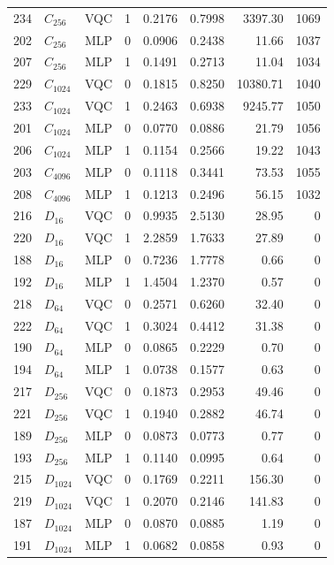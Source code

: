 \documentclass[11pt]{article}
\begin{document}
\begin{longtable}{rllrrrrr}
234 & $C_{256}$ & VQC & 1 & 0.2176 & 0.7998 & 3397.30 & 1069 \\
202 & $C_{256}$ & MLP & 0 & 0.0906 & 0.2438 & 11.66 & 1037 \\
207 & $C_{256}$ & MLP & 1 & 0.1491 & 0.2713 & 11.04 & 1034 \\
229 & $C_{1024}$ & VQC & 0 & 0.1815 & 0.8250 & 10380.71 & 1040 \\
233 & $C_{1024}$ & VQC & 1 & 0.2463 & 0.6938 & 9245.77 & 1050 \\
201 & $C_{1024}$ & MLP & 0 & 0.0770 & 0.0886 & 21.79 & 1056 \\
206 & $C_{1024}$ & MLP & 1 & 0.1154 & 0.2566 & 19.22 & 1043 \\
203 & $C_{4096}$ & MLP & 0 & 0.1118 & 0.3441 & 73.53 & 1055 \\
208 & $C_{4096}$ & MLP & 1 & 0.1213 & 0.2496 & 56.15 & 1032 \\
216 & $D_{16}$ & VQC & 0 & 0.9935 & 2.5130 & 28.95 & 0 \\
220 & $D_{16}$ & VQC & 1 & 2.2859 & 1.7633 & 27.89 & 0 \\
188 & $D_{16}$ & MLP & 0 & 0.7236 & 1.7778 & 0.66 & 0 \\
192 & $D_{16}$ & MLP & 1 & 1.4504 & 1.2370 & 0.57 & 0 \\
218 & $D_{64}$ & VQC & 0 & 0.2571 & 0.6260 & 32.40 & 0 \\
222 & $D_{64}$ & VQC & 1 & 0.3024 & 0.4412 & 31.38 & 0 \\
190 & $D_{64}$ & MLP & 0 & 0.0865 & 0.2229 & 0.70 & 0 \\
194 & $D_{64}$ & MLP & 1 & 0.0738 & 0.1577 & 0.63 & 0 \\
217 & $D_{256}$ & VQC & 0 & 0.1873 & 0.2953 & 49.46 & 0 \\
221 & $D_{256}$ & VQC & 1 & 0.1940 & 0.2882 & 46.74 & 0 \\
189 & $D_{256}$ & MLP & 0 & 0.0873 & 0.0773 & 0.77 & 0 \\
193 & $D_{256}$ & MLP & 1 & 0.1140 & 0.0995 & 0.64 & 0 \\
215 & $D_{1024}$ & VQC & 0 & 0.1769 & 0.2211 & 156.30 & 0 \\
219 & $D_{1024}$ & VQC & 1 & 0.2070 & 0.2146 & 141.83 & 0 \\
187 & $D_{1024}$ & MLP & 0 & 0.0870 & 0.0885 & 1.19 & 0 \\
191 & $D_{1024}$ & MLP & 1 & 0.0682 & 0.0858 & 0.93 & 0 \\
\end{longtable}
\endgroup
\end{document}
